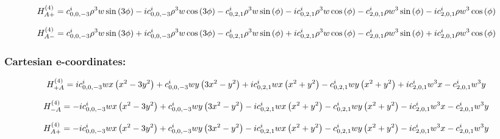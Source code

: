 \documentclass[fleqn]{article}
\begin{document}
\begin{dmath*}
H_{A+}^{(4)}=c^{i}_{0,0,-3} \rho^{3} w \sin{\left (3 \phi \right )} -  i c^{i}_{0,0,-3} \rho^{3} w \cos{\left (3 \phi \right )} - c^{i}_{0,2,1} \rho^{3} w \sin{\left (\phi \right )} -  i c^{i}_{0,2,1} \rho^{3} w \cos{\left (\phi \right )} - c^{i}_{2,0,1} \rho w^{3} \sin{\left (\phi \right )} -  i c^{i}_{2,0,1} \rho w^{3} \cos{\left (\phi \right )}\\
\end{dmath*}

\begin{dmath*}
H_{A-}^{(4)}=c^{i}_{0,0,-3} \rho^{3} w \sin{\left (3 \phi \right )} +  i c^{i}_{0,0,-3} \rho^{3} w \cos{\left (3 \phi \right )} - c^{i}_{0,2,1} \rho^{3} w \sin{\left (\phi \right )} +  i c^{i}_{0,2,1} \rho^{3} w \cos{\left (\phi \right )} - c^{i}_{2,0,1} \rho w^{3} \sin{\left (\phi \right )} +  i c^{i}_{2,0,1} \rho w^{3} \cos{\left (\phi \right )}\\
\end{dmath*}
\subsubsection*{Cartesian e-coordinates:}

\begin{dmath*}
H_{+A}^{(4)}= i c^{i}_{0,0,-3} w x \left(x^{2} - 3 y^{2}\right) + c^{i}_{0,0,-3} w y \left(3 x^{2} - y^{2}\right) +  i c^{i}_{0,2,1} w x \left(x^{2} + y^{2}\right) - c^{i}_{0,2,1} w y \left(x^{2} + y^{2}\right) +  i c^{i}_{2,0,1} w^{3} x - c^{i}_{2,0,1} w^{3} y\\
\end{dmath*}

\begin{dmath*}
H_{-A}^{(4)}=-  i c^{i}_{0,0,-3} w x \left(x^{2} - 3 y^{2}\right) + c^{i}_{0,0,-3} w y \left(3 x^{2} - y^{2}\right) -  i c^{i}_{0,2,1} w x \left(x^{2} + y^{2}\right) - c^{i}_{0,2,1} w y \left(x^{2} + y^{2}\right) -  i c^{i}_{2,0,1} w^{3} x - c^{i}_{2,0,1} w^{3} y\\
\end{dmath*}

\begin{dmath*}
H_{A+}^{(4)}=-  i c^{i}_{0,0,-3} w x \left(x^{2} - 3 y^{2}\right) + c^{i}_{0,0,-3} w y \left(3 x^{2} - y^{2}\right) -  i c^{i}_{0,2,1} w x \left(x^{2} + y^{2}\right) - c^{i}_{0,2,1} w y \left(x^{2} + y^{2}\right) -  i c^{i}_{2,0,1} w^{3} x - c^{i}_{2,0,1} w^{3} y\\
\end{dmath*}
\end{document}
